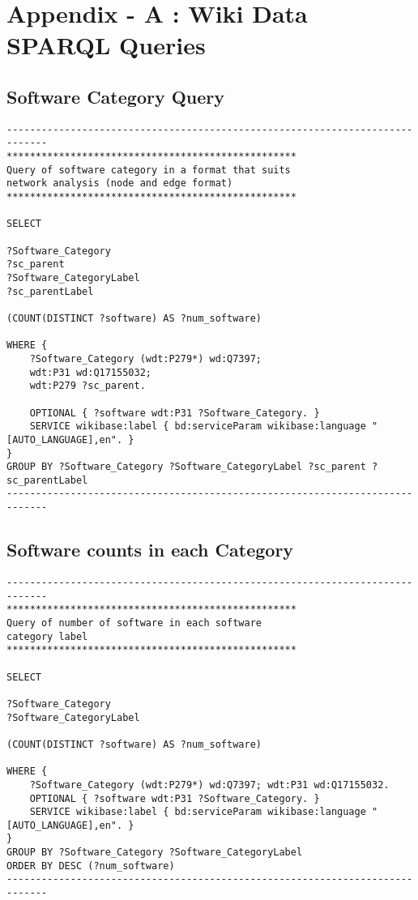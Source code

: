 \chapter{Appendix - A : Wiki Data SPARQL Queries}\label{ch:classicthesis}

\section{Software Category Query}

\begin{verbatim}
-----------------------------------------------------------------------------
**************************************************
Query of software category in a format that suits 
network analysis (node and edge format)
**************************************************
	
SELECT 

?Software_Category 
?sc_parent 
?Software_CategoryLabel 
?sc_parentLabel 

(COUNT(DISTINCT ?software) AS ?num_software) 

WHERE {	
	?Software_Category (wdt:P279*) wd:Q7397;
	wdt:P31 wd:Q17155032;
	wdt:P279 ?sc_parent.
	
	OPTIONAL { ?software wdt:P31 ?Software_Category. }
	SERVICE wikibase:label { bd:serviceParam wikibase:language "[AUTO_LANGUAGE],en". }
}
GROUP BY ?Software_Category ?Software_CategoryLabel ?sc_parent ?sc_parentLabel
-----------------------------------------------------------------------------
\end{verbatim}
	
\section{Software counts in each Category}

\begin{verbatim}
-----------------------------------------------------------------------------
**************************************************
Query of number of software in each software 
category label 
**************************************************

SELECT 

?Software_Category 
?Software_CategoryLabel 

(COUNT(DISTINCT ?software) AS ?num_software) 

WHERE {	
	?Software_Category (wdt:P279*) wd:Q7397; wdt:P31 wd:Q17155032.
	OPTIONAL { ?software wdt:P31 ?Software_Category. }
	SERVICE wikibase:label { bd:serviceParam wikibase:language "[AUTO_LANGUAGE],en". }
}
GROUP BY ?Software_Category ?Software_CategoryLabel
ORDER BY DESC (?num_software)
-----------------------------------------------------------------------------
\end{verbatim}
